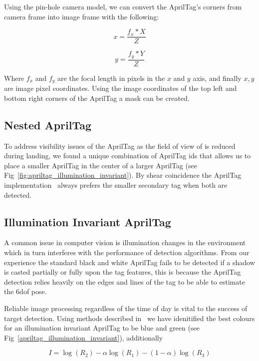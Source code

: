 \documentclass[letterpaper, 10 pt, conference]{ieeeconf}
\begin{document}
Using the pin-hole camera model, we can convert the AprilTag's corners
from camera frame into image frame with the following:

\begin{equation}
  x = \dfrac{f_{x} * X}{Z}
\end{equation}

\begin{equation}
  y = \dfrac{f_{y} * Y}{Z}
\end{equation}

Where $f_{x}$ and $f_{y}$ are the focal length in pixels in the $x$ and
$y$ axis, and finally $x, y$ are image pixel coordinates. Using the
image coordinates of the top left and bottom right corners of the AprilTag
a mask can be created.

\subsection{Nested AprilTag}
To address visibility issues of the AprilTag as the field of view of is reduced
during landing, we found a unique combination of AprilTag ids that allows us to
place a smaller AprilTag in the center of a larger AprilTag (see
Fig~\ref{fig:apriltag_illumination_invariant}). By shear coincidence the
AprilTag implementation~\cite{AprilTagMIT} always prefers the smaller secondary
tag when both are detected.

\subsection{Illumination Invariant AprilTag}
A common issue in computer vision is illumination changes in the
environment which in turn interferes with the performance of detection
algorithms. From our experience the standard black and white AprilTag
fails to be detected if a shadow is casted partially or fully upon the tag
features, this is because the AprilTag detection relies heavily on the
edges and lines of the tag to be able to estimate the 6dof pose.

Reliable image processing regardless of the time of day is vital to the
success of target detection. Using methods described in~\cite{Maddern14}
we have idenitified the best colours for an illumination invariant
AprilTag to be blue and green (see
Fig~\ref{apriltag_illumination_invariant}), additionally

\begin{equation}
  I = \log(R_{2}) - \alpha \log(R_{1}) - (1 - \alpha) \log(R_{3})
\end{equation}
\end{document}
